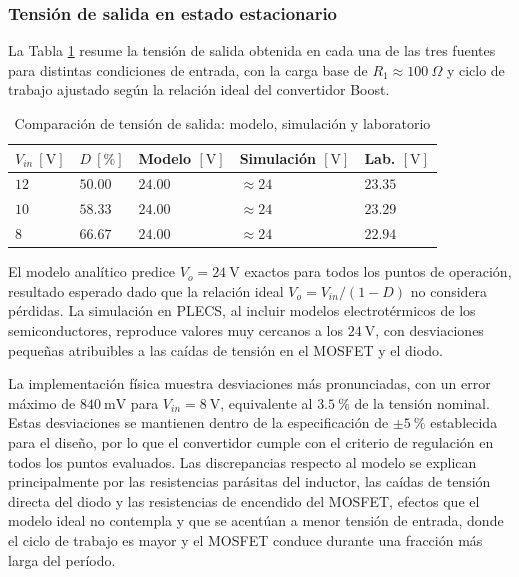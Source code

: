 \documentclass[conference]{IEEEtran}
\begin{document}
\subsubsection{Tensión de salida en estado estacionario}

La Tabla \ref{tab:comparacion_modelo_sim_lab} resume la tensión de salida obtenida
en cada una de las tres fuentes para distintas condiciones de entrada, con la carga
base de $R_1 \approx 100~\Omega$ y ciclo de trabajo ajustado según la relación
ideal del convertidor Boost.

\begin{table}[H]
    \centering
    \renewcommand{\arraystretch}{1.5}
    \begin{tabularx}{\columnwidth}{
        >{\hsize=0.7\hsize}X
        >{\hsize=0.7\hsize}X
        >{\hsize=0.85\hsize}X
        >{\hsize=0.85\hsize}X
        >{\hsize=0.9\hsize}X
    }
        \toprule
        $V_{in}~[\mathrm{V}]$ & $D~[\%]$ & Modelo $[\mathrm{V}]$ & Simulación $[\mathrm{V}]$ & Lab. $[\mathrm{V}]$ \\
        \midrule
        $12$ & $50.00$ & $24.00$ & $\approx 24$ & $23.35$ \\
        $10$ & $58.33$ & $24.00$ & $\approx 24$ & $23.29$ \\
        $8$  & $66.67$ & $24.00$ & $\approx 24$ & $22.94$ \\
        \bottomrule
    \end{tabularx}
    \caption{Comparación de tensión de salida: modelo, simulación y laboratorio}
    \label{tab:comparacion_modelo_sim_lab}
\end{table}

El modelo analítico predice $V_o = 24~\mathrm{V}$ exactos para todos los puntos de
operación, resultado esperado dado que la relación ideal $V_o = V_{in}/(1-D)$ no
considera pérdidas. La simulación en PLECS, al incluir modelos electrotérmicos de los
semiconductores, reproduce valores muy cercanos a los $24~\mathrm{V}$, con desviaciones
pequeñas atribuibles a las caídas de tensión en el MOSFET y el diodo.

La implementación física muestra desviaciones más pronunciadas, con un error máximo
de $840~\mathrm{mV}$ para $V_{in} = 8~\mathrm{V}$, equivalente al $3.5~\%$ de la
tensión nominal. Estas desviaciones se mantienen dentro de la especificación de
$\pm 5~\%$ establecida para el diseño, por lo que el convertidor cumple con el
criterio de regulación en todos los puntos evaluados. Las discrepancias respecto al
modelo se explican principalmente por las resistencias parásitas del inductor, las
caídas de tensión directa del diodo y las resistencias de encendido del MOSFET,
efectos que el modelo ideal no contempla y que se acentúan a menor tensión de entrada,
donde el ciclo de trabajo es mayor y el MOSFET conduce durante una fracción más
larga del período.
\end{document}
